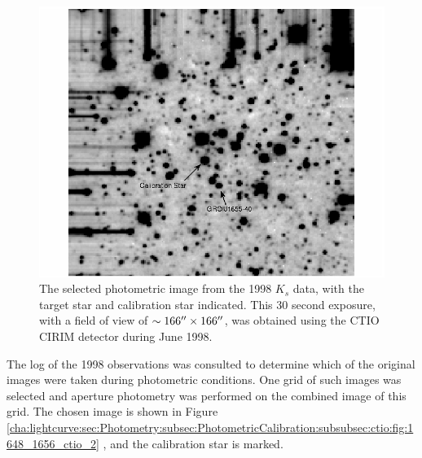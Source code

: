 \begin{figure}[!htb]
\begin{center}
\includegraphics[width=5.0in]{1648_1656_ctio_2}
\caption{%
The selected photometric image from the 1998 $K_s$ data, with the
target star and calibration star indicated. This 30 second exposure,
with a field of view of $\sim 166\hbox{$^{\prime\prime}$} \times 166\hbox{$^{\prime\prime}$} $, was
obtained using the CTIO CIRIM detector during June 1998. }
\label{cha:lightcurve:sec:Photometry:subsec:PhotometricCalibration:subsubsec:ctio:fig:1648_1656_ctio_2}
\end{center}
\end{figure}

\vspace{\myparskip}

The log of the 1998 observations was consulted to determine
which of the original images were taken during photometric
conditions. One grid of such images was selected and aperture
photometry was performed on the combined image of this grid. The chosen image is shown in Figure~%
\vref{cha:lightcurve:sec:Photometry:subsec:PhotometricCalibration:subsubsec:ctio:fig:1648_1656_ctio_2}%
, and the calibration star is marked. %

\vspace{\myparskip}

